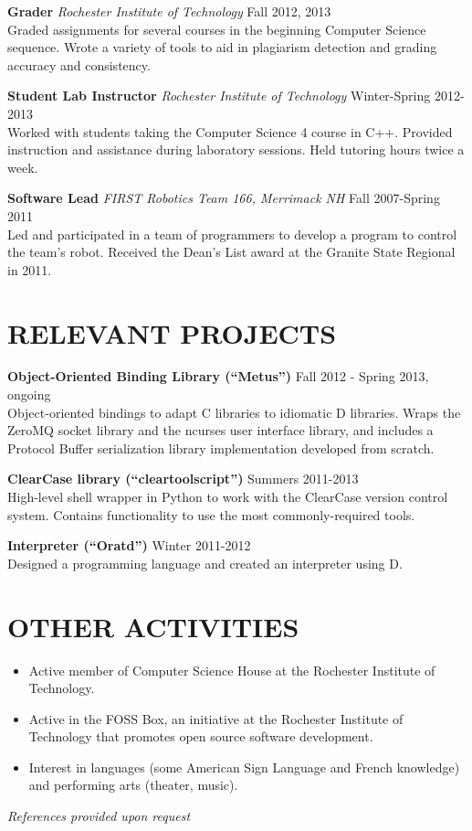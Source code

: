 \documentclass[line]{res}
\begin{document}
\begin{resume}
	\textbf{Grader}
	\textit{Rochester Institute of Technology}
	\hfill
	Fall 2012, 2013\\
	Graded assignments for several courses in the beginning Computer Science sequence.
	Wrote a variety of tools to aid in plagiarism detection and grading accuracy and consistency.

	\textbf{Student Lab Instructor}
	\textit{Rochester Institute of Technology}
	\hfill
	Winter-Spring 2012-2013\\
	Worked with students taking the Computer Science 4 course in C++.
	Provided instruction and assistance during laboratory sessions.
	Held tutoring hours twice a week.

	\textbf{Software Lead}
	\textit{FIRST Robotics Team 166, Merrimack NH}
	\hfill
	Fall 2007-Spring 2011\\
	Led and participated in a team of programmers to develop a program to control the team's robot.
	Received the Dean's List award at the Granite State Regional in 2011.

\section{RELEVANT PROJECTS}

	\textbf{Object-Oriented Binding Library (``Metus'')}
	\hfill
	Fall 2012 - Spring 2013, ongoing
	\\
	Object-oriented bindings to adapt C libraries to idiomatic D libraries. Wraps the ZeroMQ  socket library and the ncurses user interface library, and includes a Protocol Buffer serialization library implementation developed from scratch.
	
	\textbf{ClearCase library (``cleartoolscript'')}
	\hfill
	Summers 2011-2013
	\\
	High-level shell wrapper in Python to work with the ClearCase version control system. Contains functionality to use the most commonly-required tools.
	
	\textbf{Interpreter (``Oratd'')}
	\hfill
	Winter 2011-2012
	\\
	Designed a programming language and created an interpreter using D.%

\section{OTHER ACTIVITIES}
	\begin{itemize}[leftmargin=10pt]
	\item Active member of Computer Science House at the Rochester Institute of Technology.
	\item Active in the FOSS Box, an initiative at the Rochester Institute of Technology that promotes open source software development.
	\item Interest in languages (some American Sign Language and French knowledge) and performing arts (theater, music).
	\end{itemize}

\begin{center}
\vspace{-0.26in}
\emph{References provided upon request\\[8pt]}
\end{center}

\end{resume}
\end{document}

